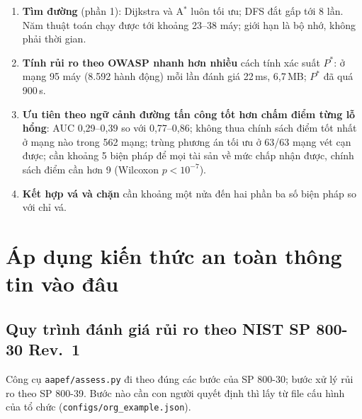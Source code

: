 \documentclass[11pt,a4paper]{article}
\begin{document}
\begin{enumerate}
  \item \textbf{Tìm đường} (phần 1): Dijkstra và A$^{*}$ luôn tối ưu; DFS đắt gấp tới 8 lần. Năm thuật toán chạy được tới khoảng 23--38 máy; giới hạn là bộ nhớ, không phải thời gian.
  \item \textbf{Tính rủi ro theo OWASP nhanh hơn nhiều} cách tính xác suất $P^{*}$: ở mạng 95 máy (8.592 hành động) mỗi lần đánh giá 22\,ms, 6,7\,MB; $P^{*}$ đã quá 900\,s.
  \item \textbf{Ưu tiên theo ngữ cảnh đường tấn công tốt hơn chấm điểm từng lỗ hổng}: AUC 0,29--0,39 so với 0,77--0,86; không thua chính sách điểm tốt nhất ở mạng nào trong 562 mạng; trùng phương án tối ưu ở 63/63 mạng vét cạn được; cần khoảng 5 biện pháp để mọi tài sản về mức chấp nhận được, chính sách điểm cần hơn 9 (Wilcoxon $p < 10^{-7}$).
  \item \textbf{Kết hợp vá và chặn} cần khoảng một nửa đến hai phần ba số biện pháp so với chỉ vá.
\end{enumerate}

\section{Áp dụng kiến thức an toàn thông tin vào đâu}

\subsection{Quy trình đánh giá rủi ro theo NIST SP 800-30 Rev.~1}

Công cụ \texttt{aapef/assess.py} đi theo đúng các bước của SP 800-30; bước xử lý rủi ro theo SP 800-39. Bước nào cần con người quyết định thì lấy từ file cấu hình của tổ chức (\texttt{configs/org\_example.json}).
\end{document}
